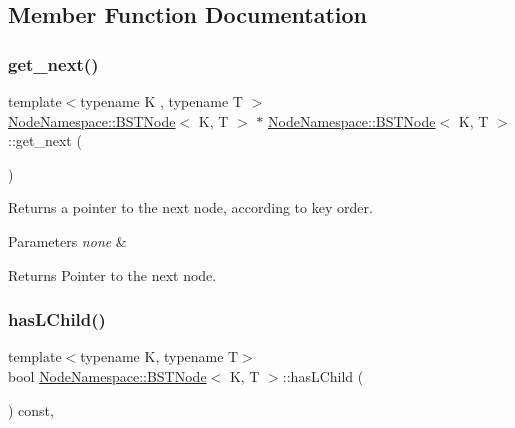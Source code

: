 \subsection{Member Function Documentation}
\mbox{\label{class_node_namespace_1_1_b_s_t_node_a706ff01acdd424c760594da6fa0cb645}} 
\subsubsection{\texorpdfstring{get\+\_\+next()}{get\_next()}}
{\footnotesize\ttfamily template$<$typename K , typename T $>$ \\
\hyperlink{class_node_namespace_1_1_b_s_t_node}{Node\+Namespace\+::\+B\+S\+T\+Node}$<$ K, T $>$ $\ast$ \hyperlink{class_node_namespace_1_1_b_s_t_node}{Node\+Namespace\+::\+B\+S\+T\+Node}$<$ K, T $>$\+::get\+\_\+next (\begin{DoxyParamCaption}{ }\end{DoxyParamCaption})\hspace{0.3cm}{\ttfamily [noexcept]}}



Returns a pointer to the next node, according to key order. 


\begin{DoxyParams}{Parameters}
{\em none} & \\
\hline
\end{DoxyParams}
\begin{DoxyReturn}{Returns}
Pointer to the next node. 
\end{DoxyReturn}
\mbox{\label{class_node_namespace_1_1_b_s_t_node_ae6572b47848a90ccf24fffd98e965888}} 
\subsubsection{\texorpdfstring{has\+L\+Child()}{hasLChild()}}
{\footnotesize\ttfamily template$<$typename K, typename T$>$ \\
bool \hyperlink{class_node_namespace_1_1_b_s_t_node}{Node\+Namespace\+::\+B\+S\+T\+Node}$<$ K, T $>$\+::has\+L\+Child (\begin{DoxyParamCaption}{ }\end{DoxyParamCaption}) const\hspace{0.3cm}{\ttfamily [inline]}, {\ttfamily [noexcept]}}



